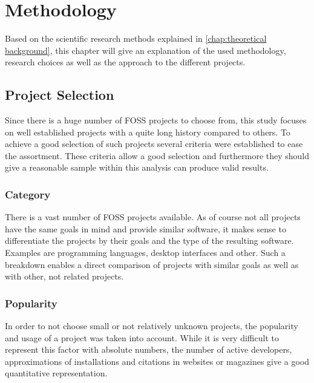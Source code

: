 \chapter{Methodology} %
\label{chap:methodology}

Based on the scientific research methods explained in \autoref{chap:theoretical
background}, this chapter will give an explanation of the used methodology,
research choices as well as the approach to the different projects.

\section{Project Selection} %

Since there is a huge number of \ac{FOSS} projects to choose from, this study
focuses on well established projects with a quite long history compared to
others. To achieve a good selection of such projects several criteria were
established to ease the assortment. These criteria allow a good selection and
furthermore they should give a reasonable sample within this analysis can
produce valid results.

\subsection{Category} %

There is a vast number of \ac{FOSS} projects available. As of course not all
projects have the same goals in mind and provide similar software, it makes
sense to differentiate the projects by their goals and the type of the
resulting software. Examples are programming languages, desktop interfaces and
other. Such a breakdown enables a direct comparison of projects with similar
goals as well as with other, not related projects.


\subsection{Popularity} %

In order to not choose small or not relatively unknown projects, the popularity
and usage of a project was taken into account. While it is very difficult to
represent this factor with absolute numbers, the number of active developers,
approximations of installations and citations in websites or magazines give a
good quantitative representation.


